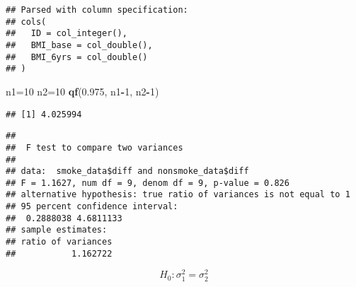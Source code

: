 \documentclass[]{article}
\newenvironment{Shaded}{\begin{snugshade}}{\end{snugshade}}
\newcommand{\KeywordTok}[1]{\textcolor[rgb]{0.13,0.29,0.53}{\textbf{#1}}}
\newcommand{\DataTypeTok}[1]{\textcolor[rgb]{0.13,0.29,0.53}{#1}}
\newcommand{\DecValTok}[1]{\textcolor[rgb]{0.00,0.00,0.81}{#1}}
\newcommand{\FloatTok}[1]{\textcolor[rgb]{0.00,0.00,0.81}{#1}}
\newcommand{\StringTok}[1]{\textcolor[rgb]{0.31,0.60,0.02}{#1}}
\newcommand{\CommentTok}[1]{\textcolor[rgb]{0.56,0.35,0.01}{\textit{#1}}}
\newcommand{\OperatorTok}[1]{\textcolor[rgb]{0.81,0.36,0.00}{\textbf{#1}}}
\newcommand{\NormalTok}[1]{#1}
\begin{document}
\begin{Shaded}
\end{Shaded}

\begin{verbatim}
## Parsed with column specification:
## cols(
##   ID = col_integer(),
##   BMI_base = col_double(),
##   BMI_6yrs = col_double()
## )
\end{verbatim}

\begin{Shaded}
\begin{Highlighting}[]
\NormalTok{n1=}\DecValTok{10}
\NormalTok{n2=}\DecValTok{10}
\KeywordTok{qf}\NormalTok{(}\FloatTok{0.975}\NormalTok{, n1}\OperatorTok{-}\DecValTok{1}\NormalTok{, n2}\OperatorTok{-}\DecValTok{1}\NormalTok{)}
\end{Highlighting}
\end{Shaded}

\begin{verbatim}
## [1] 4.025994
\end{verbatim}

\begin{Shaded}
\end{Shaded}

\begin{verbatim}
## 
##  F test to compare two variances
## 
## data:  smoke_data$diff and nonsmoke_data$diff
## F = 1.1627, num df = 9, denom df = 9, p-value = 0.826
## alternative hypothesis: true ratio of variances is not equal to 1
## 95 percent confidence interval:
##  0.2888038 4.6811133
## sample estimates:
## ratio of variances 
##           1.162722
\end{verbatim}

\[
H_{0}: \sigma_{1} ^{2} = \sigma_{2} ^{2}
\]
\end{document}
